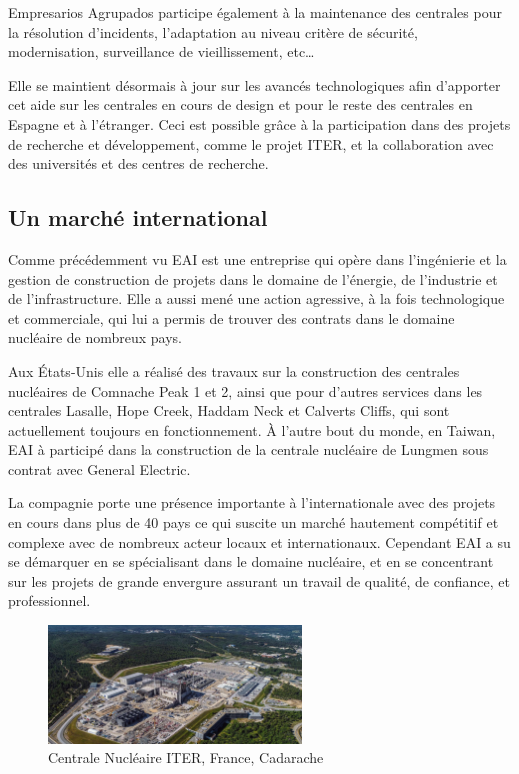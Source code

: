 \documentclass[11pt, openright]{book}
\begin{document}
Empresarios Agrupados participe également à la maintenance des centrales pour la résolution d'incidents, l'adaptation au niveau critère de sécurité, modernisation, surveillance de vieillissement, etc\dots

Elle se maintient désormais à jour sur les avancés technologiques afin d'apporter cet aide sur les centrales en cours de design et pour le reste des centrales en Espagne et à l'étranger. Ceci est possible grâce à la participation dans des projets de recherche et développement, comme le projet ITER, et la collaboration avec des universités et des centres de recherche.

\subsection{Un marché international}

Comme précédemment vu EAI est une entreprise qui opère dans l'ingénierie et la gestion de construction de projets dans le domaine de l'énergie, de l'industrie et de l'infrastructure. Elle a aussi  mené une action agressive, à la fois technologique et commerciale, qui lui a permis de trouver des contrats dans le domaine nucléaire de nombreux pays.

Aux États-Unis elle a réalisé des travaux sur la construction des centrales nucléaires de Comnache Peak 1 et 2, ainsi que pour d'autres services dans les centrales Lasalle, Hope Creek, Haddam Neck et Calverts Cliffs, qui sont actuellement toujours en fonctionnement. À l'autre bout du monde, en Taiwan, EAI à participé dans la construction de la centrale nucléaire de Lungmen sous contrat avec General Electric.

La compagnie porte une présence importante à l'internationale avec des projets en cours dans plus de 40 pays ce qui suscite un marché hautement compétitif et complexe avec de nombreux acteur locaux et internationaux. Cependant EAI a su se démarquer en se spécialisant dans le domaine nucléaire, et en se concentrant sur les projets de grande envergure assurant un travail de qualité, de confiance, et professionnel.

\begin{figure}[ht!]
    \centering
    \includegraphics[width=0.6\textwidth]{./object/ITER.jpg}
    \caption{Centrale Nucléaire ITER, France, Cadarache}
\end{figure}
\end{document}
